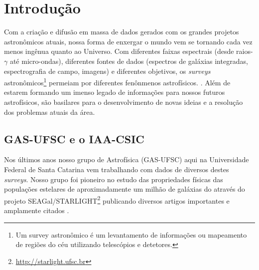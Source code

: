 


\chapter{Introdução}
\label{sec:intro}

Com a criação e difusão em massa de dados gerados com os grandes projetos astronômicos atuais, nossa
forma de enxergar o mundo vem se tornando cada vez menos ingênua quanto ao Universo. Com diferentes
faixas espectrais (desde raios-$\gamma$ até micro-ondas), diferentes fontes de dados (espectros de
galáxias integradas, espectrografia de campo, imagens) e diferentes objetivos, os {\em surveys}
astronômicos\footnote{Um survey astronômico é um levantamento de informações ou mapeamento de
regiões do céu utilizando telescópios e detetores.} permeiam por diferentes fenônmenos
astrofísicos. . Além de estarem formando um imenso legado
de informações para nossos futuros astrofísicos, são basilares para o desenvolvimento de novas
ideias e a resolução dos problemas atuais da área.
 

\section{GAS-UFSC e o IAA-CSIC}
\label{sec:intro:UFSCeIAA}

Nos últimos anos nosso grupo de Astrofísica (GAS-UFSC) aqui na Universidade Federal de Santa
Catarina vem trabalhando com dados de diversos destes {\em surveys}. Nosso grupo foi pioneiro no
estudo das propriedades físicas das populações estelares de aproximadamente um milhão de galáxias do
\SDSS através do projeto
SEAGal/STARLIGHT\footnote{\href{http://starlight.ufsc.br}{http://starlight.ufsc.br}} publicando
diversos artigos importantes e amplamente citados \citep[e.g., ][]{CidFernandes.etal.2005a,
Mateus.etal.2006a, Stasinska.etal.2006a, Asari.etal.2007a, Stasinska.etal.2008a,
CidFernandes.etal.2011a}.

